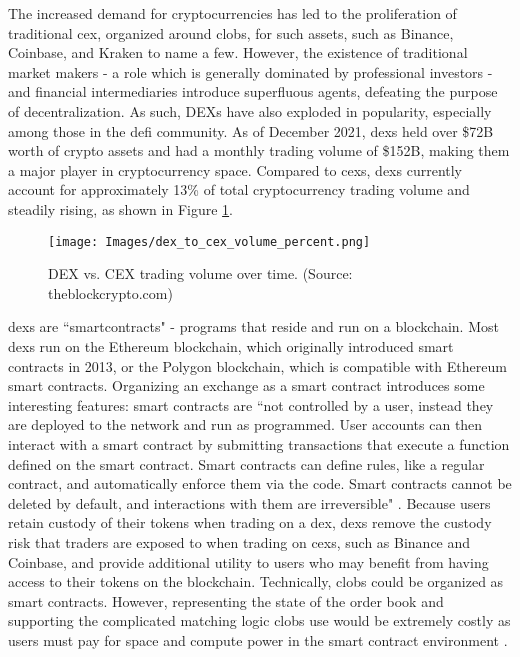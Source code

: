 \documentclass[11pt]{article}
\begin{document}
The increased demand for cryptocurrencies has led to the proliferation of traditional \gls{cex}, organized around \glspl{clob}, for such assets, such as Binance, Coinbase, and Kraken to name a few. However, the existence of traditional market makers - a role which is generally dominated by professional investors - and financial intermediaries introduce superfluous agents, defeating the purpose of decentralization. As such, DEXs have also exploded in popularity, especially among those in the \gls{defi} community. As of December 2021, \glspl{dex} held over \$72B worth of crypto assets and had a monthly trading volume of \$152B, making them a major player in cryptocurrency space. Compared to \glspl{cex}, \glspl{dex} currently account for approximately 13\% of total cryptocurrency trading volume and steadily rising, as shown in Figure \ref{fig:dex_cex_vol}.

\begin{figure}[H]
    \centering
    \texttt{[image: Images/dex\_to\_cex\_volume\_percent.png]}
    \caption{DEX vs. CEX trading volume over time. (Source: theblockcrypto.com)}
    \label{fig:dex_cex_vol}
\end{figure}

\glspl{dex} are ``\glspl{smartcontract}" - programs that reside and run on a blockchain. Most \glspl{dex} run on the Ethereum blockchain, which originally introduced smart contracts in 2013, or the Polygon blockchain, which is compatible with Ethereum smart contracts. Organizing an exchange as a smart contract introduces some interesting features: smart contracts are ``not controlled by a user, instead they are deployed to the network and run as programmed. User accounts can then interact with a smart contract by submitting transactions that execute a function defined on the smart contract. Smart contracts can define rules, like a regular contract, and automatically enforce them via the code. Smart contracts cannot be deleted by default, and interactions with them are irreversible" \citep*{EthereumSmartContracts}. Because users retain custody of their \glspl{token} when trading on a \gls{dex}, \glspl{dex} remove the custody risk that traders are exposed to when trading on \glspl{cex}, such as Binance and Coinbase, and provide additional utility to users who may benefit from having access to their tokens on the blockchain. Technically, \glspl{clob} could be organized as smart contracts. However, representing the state of the order book and supporting the complicated matching logic \glspl{clob} use would be extremely costly as users must pay for space and compute power in the smart contract environment \citep*{angeris2021analysis}.
\end{document}
